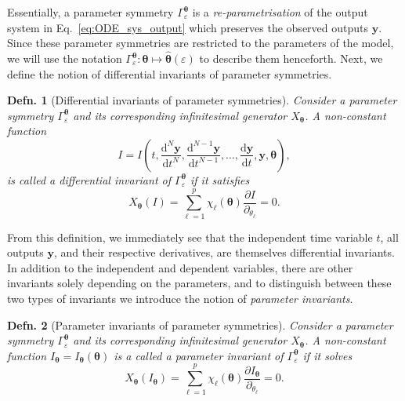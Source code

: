 \documentclass[12pt]{article}
\newtheorem{definition}{Defn.}
\begin{document}
Essentially, a parameter symmetry $\Gamma_{\varepsilon}^{\boldsymbol{\theta}}$ is a \emph{re-parametrisation} of the output system in Eq.~\eqref{eq:ODE_sys_output} which preserves the observed outputs $\mathbf{y}$. Since these parameter symmetries are restricted to the parameters of the model, we will use the notation $\Gamma_{\varepsilon}^{\boldsymbol{\theta}}:\boldsymbol{\theta}\mapsto\hat{\boldsymbol{\theta}}(\varepsilon)$ to describe them henceforth. Next, we define the notion of differential invariants of parameter symmetries.

\medskip
\begin{definition}[Differential invariants of parameter symmetries]
  Consider a parameter symmetry $\Gamma^{\boldsymbol{\theta}}_{\varepsilon}$ and its corresponding infinitesimal generator $X_{\boldsymbol{\theta}}$. A non-constant function 
  \begin{equation*}I=I\left(t,\frac{\mathrm{d}^{N}\mathbf{y}}{\mathrm{d}t^{N}},\frac{\mathrm{d}^{N-1}\mathbf{y}}{\mathrm{d}t^{N-1}},\ldots,\frac{\mathrm{d}\mathbf{y}}{\mathrm{d}t},\mathbf{y},\boldsymbol{\theta}\right),
  \end{equation*}
  is called a \textit{differential invariant} of $\Gamma^{\boldsymbol{\theta}}_{\varepsilon}$ if it satisfies
  \begin{equation}
X_{\boldsymbol{\theta}}\left(I\right)=\sum_{\ell=1}^{p}\chi_{\ell}(\boldsymbol{\theta})\frac{\partial I}{\partial_{\theta_{\ell}}}=0.
    \label{eq:invariant}
   \end{equation}
  \label{def:inv}
\end{definition}

From this definition, we immediately see that the independent time variable $t$, all outputs $\mathbf{y}$, and their respective derivatives, are themselves differential invariants. In addition to the independent and dependent variables, there are other invariants solely depending on the parameters, and to distinguish between these two types of invariants we introduce the notion of \textit{parameter invariants}.

\medskip
\begin{definition}[Parameter invariants of parameter symmetries]
  Consider a parameter symmetry $\Gamma^{\boldsymbol{\theta}}_{\varepsilon}$ and its corresponding infinitesimal generator $X_{\boldsymbol{\theta}}$. A non-constant function $I_{\boldsymbol{\theta}}=I_{\boldsymbol{\theta}}\left(\boldsymbol{\theta}\right)$ is a called a \textit{parameter invariant} of $\Gamma^{\boldsymbol{\theta}}_{\varepsilon}$ if it solves
  \begin{equation}X_{\boldsymbol{\theta}}\left(I_{\boldsymbol{\theta}}\right)=\sum_{\ell=1}^{p}\chi_{\ell}(\boldsymbol{\theta})\frac{\partial I_{\boldsymbol{\theta}}}{\partial_{\theta_{\ell}}}=0.
    \label{eq:parameter_invariant}
   \end{equation}
  \label{def:param_inv}  
\end{definition}
\end{document}
